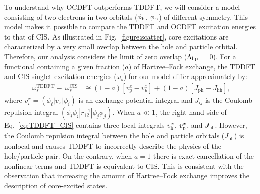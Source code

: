 \documentclass[8.5pt,twoside,twocolumn]{article}
\begin{document}
To understand why OCDFT outperforms TDDFT, we will consider a model consisting of two electrons in two orbitals ($\phi_{\rm h}$, $\phi_{\rm p}$) of different symmetry.\cite{casida_charge-transfer_2000,ziegler_implementation_2012,evangelista_orthogonality_2013}
This model makes it possible to compare the TDDFT and OCDFT excitation energies to that of CIS.
As illustrated in Fig.~\ref{figure:scatter}, core excitations are characterized by a very small overlap between the hole and particle orbital.
Therefore, our analysis considers the limit of zero overlap ($\Lambda_{\rm hp}$ = 0).
For a functional containing a given fraction ($a$) of Hartree--Fock exchange, the TDDFT and CIS singlet excitation energies ($\omega_s$) for our model differ approximately by:
\begin{align}
\label{eq:TDDFT_CIS}
\omega^{\text{TDDFT}}_s - \ \omega^{\text{CIS}}_s &\cong
(1 - a) [v_{\text{p}}^x - v_{\text{h}}^x] +  (1 - a) [J_{\text{ph}} - J_{\text{hh}}]  ,
\end{align}
where $v_{i}^x = (\phi_{i}|v_x|\phi_{i})$ is an exchange potential integral and $J_{ij}$ is the Coulomb repulsion integral $(\phi_i \phi_i|r_{12}^{-1}|\phi_j \phi_j)$. When $a \ll 1$, the right-hand side of Eq.~\ref{eq:TDDFT_CIS} contains three local integrals $v_{\rm h}^x$, $v_{\rm p}^x$, and $J_{\text{hh}}$. However, the Coulomb repulsion integral between the hole and particle orbitals ($J_{\text{ph}}$) is nonlocal and causes TDDFT to incorrectly describe the physics of the hole/particle pair.
On the contrary, when $a=1$ there is exact cancellation of the nonlinear terms and TDDFT is equivalent to CIS.
This is consistent with the observation that increasing the amount of Hartree--Fock exchange improves the description of core-excited states.\cite{heyd_hybrid_2003,nakata_time-dependent_2006,song_core-excitation_2008,henderson_importance_2007,henderson_assessment_2008}
 
\end{document}
